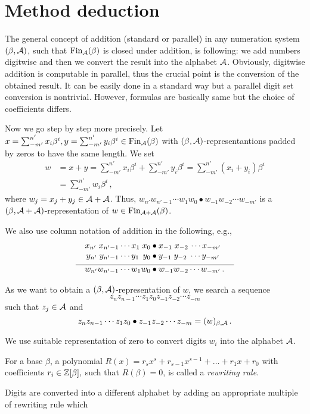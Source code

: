 \section{Method deduction}
The general concept of addition (standard or parallel) in any numeration system $(\beta,\mathcal{A})$, such that $\text{Fin}_{\mathcal{A}}(\beta)$ is closed under addition, is following: we add numbers digitwise and then we convert the result into the alphabet $\mathcal{A}$. Obviously, digitwise addition is computable in parallel, thus the crucial point is the conversion of the obtained result. It can be easily done in a standard way but a parallel digit set conversion is nontrivial. However, formulas are basically same but the choice of coefficients differs.

Now we go step by step more precisely. Let $x=\sum_{-m'}^{n'} x_i\beta^i,y=\sum_{-m'}^{n'} y_i\beta^i \in \text{Fin}_{\mathcal{A}}(\beta)$ with $(\beta,\mathcal{A})$-representantions padded by zeros to have the same length. We set 
  \begin{align*}
    w&=x+y =\sum_{-m'}^{n'} x_i\beta^i + \sum_{-m'}^{n'} y_i\beta^i = \sum_{-m'}^{n'} (x_i+y_i)\beta^i \\
    &=\sum_{-m'}^{n'} w_i\beta^i \,,
  \end{align*}
  where $w_j=x_j+y_j \in \mathcal{A} +\mathcal{A}$. Thus, $w_{n'} w_{{n'}-1}\cdots w_1 w_0 \bullet w_{-1} w_{-2} \cdots w_{-m'}$ is a  $(\beta, \mathcal{A}+\mathcal{A})$-representation of $w\in \text{Fin}_{\mathcal{A}+\mathcal{A}}(\beta)$. 

We also use column notation of addition in the following, e.g.,     
  \begin{align*}
  x_{n'} \;x_{{n'}-1}\cdots x_1 \;x_0 &\bullet x_{-1} \;x_{-2}\, \cdots x_{-m'} \\[-3pt]
  y_{n'} \;y_{{n'}-1}\cdots y_1 \,\;y_0 &\bullet y_{-1} \;y_{-2} \;\cdots y_{-m'} \\[-7pt]
    \line(1,0){90} & \line(1,0){100} \\[-7pt]
  w_{n'} w_{{n'}-1}\cdots w_1 w_0 &\bullet w_{-1} w_{-2} \cdots w_{-m'}\,.
  \end{align*}
  
As we want to obtain a $(\beta,\mathcal{A})$-representation of $w$, we search a sequence 
  $$z_{n} z_{n-1}\cdots z_1 z_0 z_{-1} z_{-2} \cdots z_{-m}$$ such that $z_j \in \mathcal{A}$ and
  $$
    z_{n} z_{n-1}\cdots z_1 z_0 \bullet z_{-1} z_{-2} \cdots z_{-m}=(w)_{\beta,\mathcal{A}}\,.
  $$
  
  We use suitable representation of zero to convert digits $w_i$ into the alphabet $\mathcal{A}$. 
  \begin{defn}
  For a base $\beta$, a polynomial $R(x)=r_s x^s+r_{s-1}x^{s-1}+ \dots + r_1 x+r_0$ with coefficients $r_i \in \mathbb{Z}[\beta],$ such that $R(\beta)=0$, is called a \emph{rewriting rule}.
  \end{defn}  
  Digits are converted into a different alphabet by adding an appropriate multiple of rewriting rule which   



